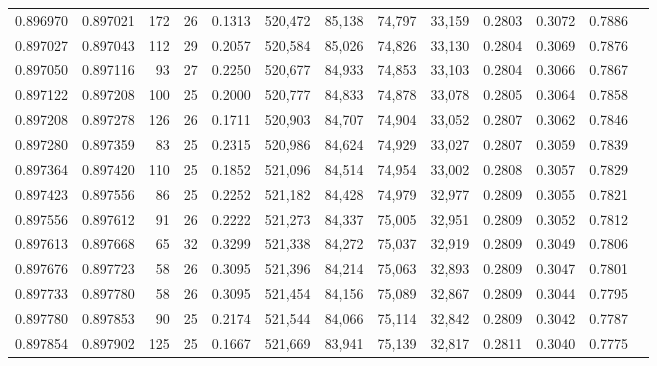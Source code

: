 \begin{tabular}{rrrrrrrrrrrrr}
0.896970 & 0.897021 &   172 &  26 &                                     0.1313 & 520,472 &  85,138 &  74,797 &  33,159 & 0.2803 & 0.3072 & 0.7886 \\
0.897027 & 0.897043 &   112 &  29 &                                     0.2057 & 520,584 &  85,026 &  74,826 &  33,130 & 0.2804 & 0.3069 & 0.7876 \\
0.897050 & 0.897116 &    93 &  27 &                                     0.2250 & 520,677 &  84,933 &  74,853 &  33,103 & 0.2804 & 0.3066 & 0.7867 \\
0.897122 & 0.897208 &   100 &  25 &                                     0.2000 & 520,777 &  84,833 &  74,878 &  33,078 & 0.2805 & 0.3064 & 0.7858 \\
0.897208 & 0.897278 &   126 &  26 &                                     0.1711 & 520,903 &  84,707 &  74,904 &  33,052 & 0.2807 & 0.3062 & 0.7846 \\
0.897280 & 0.897359 &    83 &  25 &                                     0.2315 & 520,986 &  84,624 &  74,929 &  33,027 & 0.2807 & 0.3059 & 0.7839 \\
0.897364 & 0.897420 &   110 &  25 &                                     0.1852 & 521,096 &  84,514 &  74,954 &  33,002 & 0.2808 & 0.3057 & 0.7829 \\
0.897423 & 0.897556 &    86 &  25 &                                     0.2252 & 521,182 &  84,428 &  74,979 &  32,977 & 0.2809 & 0.3055 & 0.7821 \\
0.897556 & 0.897612 &    91 &  26 &                                     0.2222 & 521,273 &  84,337 &  75,005 &  32,951 & 0.2809 & 0.3052 & 0.7812 \\
0.897613 & 0.897668 &    65 &  32 &                                     0.3299 & 521,338 &  84,272 &  75,037 &  32,919 & 0.2809 & 0.3049 & 0.7806 \\
0.897676 & 0.897723 &    58 &  26 &                                     0.3095 & 521,396 &  84,214 &  75,063 &  32,893 & 0.2809 & 0.3047 & 0.7801 \\
0.897733 & 0.897780 &    58 &  26 &                                     0.3095 & 521,454 &  84,156 &  75,089 &  32,867 & 0.2809 & 0.3044 & 0.7795 \\
0.897780 & 0.897853 &    90 &  25 &                                     0.2174 & 521,544 &  84,066 &  75,114 &  32,842 & 0.2809 & 0.3042 & 0.7787 \\
0.897854 & 0.897902 &   125 &  25 &                                     0.1667 & 521,669 &  83,941 &  75,139 &  32,817 & 0.2811 & 0.3040 & 0.7775 \\

\end{tabular}
